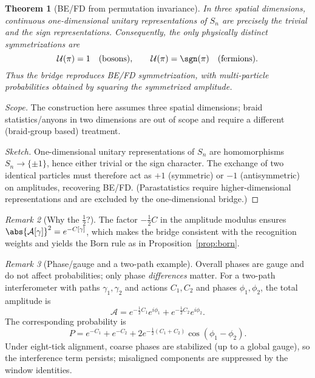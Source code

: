 \documentclass[12pt,a4paper]{article}
\newtheorem{theorem}{Theorem}[section]
\theoremstyle{definition}
\theoremstyle{remark}
\newtheorem{remark}[theorem]{Remark}
\begin{document}
\begin{theorem}[BE/FD from permutation invariance]
\label{thm:be-fd}
In three spatial dimensions, continuous one-dimensional unitary representations of $S_n$ are precisely the trivial and the sign representations. Consequently, the only physically distinct symmetrizations are
\[
  \mathcal{U}(\pi)=1\quad\text{(bosons)},\qquad
  \mathcal{U}(\pi)=\sgn(\pi)\quad\text{(fermions)}.
\]
Thus the bridge reproduces BE/FD symmetrization, with multi-particle probabilities obtained by squaring the symmetrized amplitude.
\end{theorem}

\noindent\emph{Scope.} The construction here assumes three spatial dimensions; braid statistics/anyons in two dimensions are out of scope and require a different (braid‑group based) treatment.

\begin{proof}[Sketch]
One-dimensional unitary representations of $S_n$ are homomorphisms $S_n\to \{\pm 1\}$, hence either trivial or the sign character. The exchange of two identical particles must therefore act as $+1$ (symmetric) or $-1$ (antisymmetric) on amplitudes, recovering BE/FD. (Parastatistics require higher-dimensional representations and are excluded by the one-dimensional bridge.)
\end{proof}

\begin{remark}[Why the \texorpdfstring{$\tfrac12$}{1/2}?]
The factor $-\tfrac12 C$ in the amplitude modulus ensures \(\abs{\mathcal{A}[\gamma]}^2=e^{-C[\gamma]}\), which makes the bridge consistent with the recognition weights and yields the Born rule as in Proposition~\ref{prop:born}.
\end{remark}

\begin{remark}[Phase/gauge and a two-path example]
Overall phases are gauge and do not affect probabilities; only phase \emph{differences} matter. For a two-path interferometer with paths \(\gamma_1,\gamma_2\) and actions \(C_1,C_2\) and phases \(\phi_1,\phi_2\), the total amplitude is
\[
 \mathcal{A}=e^{-\tfrac12 C_1}e^{i\phi_1}+e^{-\tfrac12 C_2}e^{i\phi_2}.
\]
The corresponding probability is
\[
 P= e^{-C_1}+e^{-C_2}+2e^{-\tfrac12(C_1+C_2)}\cos(\phi_1-\phi_2).
\]
Under eight-tick alignment, coarse phases are stabilized (up to a global gauge), so the interference term persists; misaligned components are suppressed by the window identities.
\end{remark}
\end{document}
